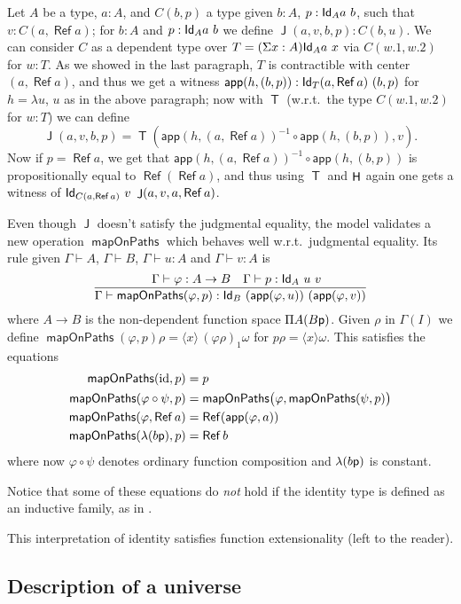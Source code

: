 \documentclass[a4paper,USenglish,draft]{lipics}
\DeclareMathOperator{\Ref}{\mathsf{Ref}}
\DeclareMathOperator{\Transp}{\mathsf{T}}
\DeclareMathOperator{\HH}{{\sf H}}
\DeclareMathOperator{\Jel}{\mathsf{J}}
\newcommand{\app}{\mathsf{app}}
\newcommand{\Id}{{\sf Id}}
\newcommand{\pp}{{\sf p}}
\DeclareMathOperator{\mapOnPaths}{\mathsf{mapOnPaths}}
\newcommand{\bind}[2]{{\langle}#1{\rangle}#2}
\begin{document}
Let $A$ be a type, $a : A$, and $C (b,p)$ a type given $b : A$, $p :
\Id_A a~b$, such that $v : C (a, \Ref a)$; for $b : A$ and $p :
\Id_{A} a~b$ we define $\Jel (a,v,b,p) : C (b,u)$.  We can consider
$C$ as a dependent type over $T = (\Sigma x : A) \Id_A a~x$ via $C
(w.1, w.2)$ for $w : T$.  As we showed in the last paragraph, $T$ is
contractible with center $(a, \Ref a)$, and thus we get a witness
$\app (h, (b,p)) : \Id_T (a,\Ref a)~(b,p)$ for $h = \lambda u$, $u$ as
in the above paragraph; now with $\Transp$ (w.r.t.\ the type $C (w.1,
w.2)$ for $w : T$) we can define
\[
\Jel (a,v,b,p) = \Transp (\app (h, (a,\Ref a))^{-1} \circ \app
(h,(b,p)), v).
\]
Now if $p = \Ref a$, we get that $\app (h, (a,\Ref a))^{-1} \circ \app
(h,(b,p))$ is propositionally equal to $\Ref (\Ref a)$, and thus using
$\Transp$ and $\HH$ again one gets a witness of $\Id_{C (a, \Ref a)}~
v~\Jel (a,v,a,\Ref a)$.

Even though $\Jel$ doesn't satisfy the judgmental equality, the model
validates a new operation $\mapOnPaths$ which behaves well w.r.t.\
judgmental equality.  Its rule given $\Gamma \vdash A$, $\Gamma \vdash
B$, $\Gamma \vdash u : A$ and $\Gamma \vdash v : A$ is
\[
\frac {\quad \Gamma \vdash \varphi : A \to B \quad \Gamma \vdash p :
  \Id_A~u~v} {\Gamma \vdash \mapOnPaths (\varphi, p) : \Id_B~(\app
  (\varphi,u))~(\app (\varphi,v))}
\]
where $A \to B$ is the non-dependent function space $\Pi A (B \pp)$.
Given $\rho$ in $\Gamma (I)$ we define $\mapOnPaths (\varphi, p) \rho
= \bind{x} \, (\varphi \rho)_1 \omega$ for $p \rho = \bind x \omega$.
This satisfies the equations
\begin{align*}
  \mapOnPaths (\mathrm{id}, p) & = p \\
  \mapOnPaths (\varphi \circ \psi, p) &= \mapOnPaths \bigl( \varphi,
  \mapOnPaths (\psi, p) \bigr)\\
  \mapOnPaths (\varphi, \Ref a) &= \Ref (\app (\varphi, a))\\
  \mapOnPaths (\lambda (b \pp), p) &= \Ref b
\end{align*}
where now $\varphi \circ \psi$ denotes ordinary function composition
and $\lambda (b \pp)$ is constant.

 Notice that some of these equations do {\em not} hold if the
identity type is defined as an inductive family, as in \cite{MLTT}.


\medskip

This interpretation of identity satisfies function extensionality
(left to the reader).


\subsection{Description of a universe}
\end{document}

